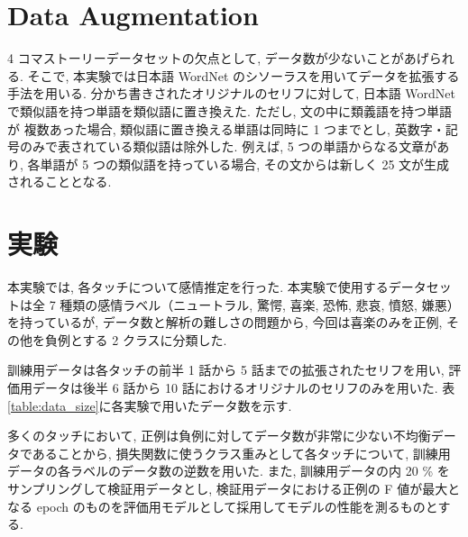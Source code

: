 \documentclass[twocolumn]{jarticle}     %
\begin{document}
\section{Data Augmentation}
4 コマストーリーデータセットの欠点として, データ数が少ないことがあげられる. そこで, 本実験では日本語 WordNet \cite{word_net_jp} のシソーラスを用いてデータを拡張する手法を用いる.
分かち書きされたオリジナルのセリフに対して, 日本語 WordNet で類似語を持つ単語を類似語に置き換えた. ただし, 文の中に類義語を持つ単語が
複数あった場合, 類似語に置き換える単語は同時に 1 つまでとし, 英数字・記号のみで表されている類似語は除外した. 例えば, 5 つの単語からなる文章があり,
各単語が 5 つの類似語を持っている場合, その文からは新しく 25 文が生成されることとなる.

\section{実験}
本実験では, 各タッチについて感情推定を行った.
本実験で使用するデータセットは全 7 種類の感情ラベル（ニュートラル, 驚愕, 喜楽, 恐怖, 悲哀, 憤怒, 嫌悪）
を持っているが, データ数と解析の難しさの問題から, 今回は喜楽のみを正例, その他を負例とする 2 クラスに分類した.

訓練用データは各タッチの前半 1 話から 5 話までの拡張されたセリフを用い,
評価用データは後半 6 話から 10 話におけるオリジナルのセリフのみを用いた.
表\ref{table:data_size}に各実験で用いたデータ数を示す.

多くのタッチにおいて, 正例は負例に対してデータ数が非常に少ない不均衡データであることから, 損失関数に使うクラス重みとして各タッチについて, 訓練用データの各ラベルのデータ数の逆数を用いた. また, 訓練用データの内 20 \% をサンプリングして検証用データとし, 検証用データにおける正例の F 値が最大となる epoch のものを評価用モデルとして採用してモデルの性能を測るものとする.
\end{document}
